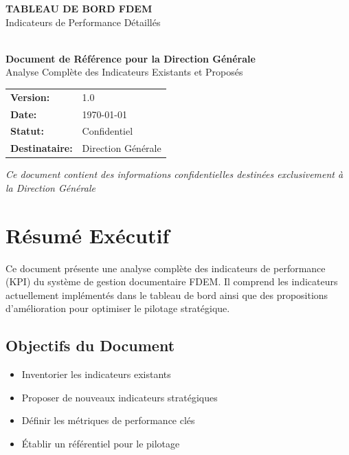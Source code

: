 \documentclass[12pt,a4paper]{article}
\begin{document}
\begin{titlepage}
    \centering
    \vspace*{2cm}
    
    {\Huge\bfseries\color{primaryblue} TABLEAU DE BORD FDEM}\\[0.5cm]
    {\Large\color{darkblue} Indicateurs de Performance Détaillés}\\[2cm]
    
    \\[2cm]
    
    {\large\textbf{Document de Référence pour la Direction Générale}}\\[1cm]
    {\large Analyse Complète des Indicateurs Existants et Proposés}\\[3cm]
    
    \begin{tabular}{ll}
        \textbf{Version:} & 1.0 \\
        \textbf{Date:} & \today \\
        \textbf{Statut:} & Confidentiel \\
        \textbf{Destinataire:} & Direction Générale
    \end{tabular}
    
    \vfill
    {\small\textit{Ce document contient des informations confidentielles destinées exclusivement à la Direction Générale}}
\end{titlepage}

\tableofcontents
\newpage

\section{Résumé Exécutif}

Ce document présente une analyse complète des indicateurs de performance (KPI) du système de gestion documentaire FDEM. Il comprend les indicateurs actuellement implémentés dans le tableau de bord ainsi que des propositions d'amélioration pour optimiser le pilotage stratégique.

\subsection{Objectifs du Document}
\begin{itemize}
    \item Inventorier les indicateurs existants
    \item Proposer de nouveaux indicateurs stratégiques
    \item Définir les métriques de performance clés
    \item Établir un référentiel pour le pilotage
\end{itemize}
\end{document}
